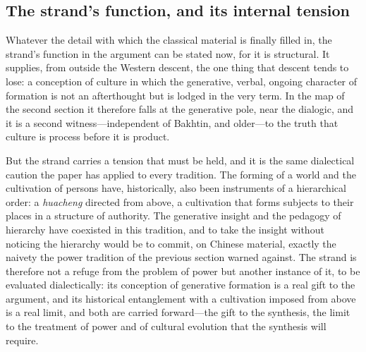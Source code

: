 \subsection*{The strand's function, and its internal tension}

Whatever the detail with which the classical material is finally filled in, the strand's function in the argument can be stated now, for it is structural. It supplies, from outside the Western descent, the one thing that descent tends to lose: a conception of culture in which the generative, verbal, ongoing character of formation is not an afterthought but is lodged in the very term. In the map of the second section it therefore falls at the generative pole, near the dialogic, and it is a second witness---independent of Bakhtin, and older---to the truth that culture is process before it is product.

But the strand carries a tension that must be held, and it is the same dialectical caution the paper has applied to every tradition. The forming of a world and the cultivation of persons have, historically, also been instruments of a hierarchical order: a \emph{huacheng} directed from above, a cultivation that forms subjects to their places in a structure of authority. The generative insight and the pedagogy of hierarchy have coexisted in this tradition, and to take the insight without noticing the hierarchy would be to commit, on Chinese material, exactly the naivety the power tradition of the previous section warned against. The strand is therefore not a refuge from the problem of power but another instance of it, to be evaluated dialectically: its conception of generative formation is a real gift to the argument, and its historical entanglement with a cultivation imposed from above is a real limit, and both are carried forward---the gift to the synthesis, the limit to the treatment of power and of cultural evolution that the synthesis will require.
